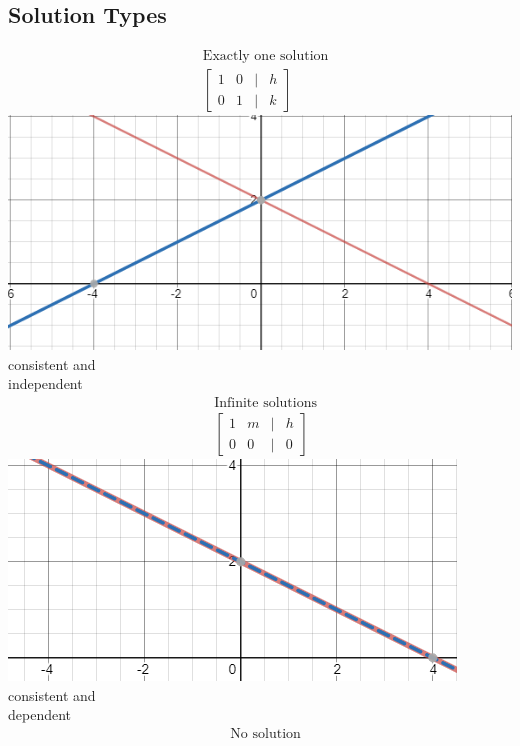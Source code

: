 \documentclass[14pt]{extarticle}
\begin{document}
\subsection*{Solution Types}
\begin{multicols}{3}
	\begin{align*}
		&\text{Exactly one solution} \\
		&\begin{bmatrix}
			1 & 0 & | & h\\
			0 & 1 & | & k
		\end{bmatrix} 
	\end{align*}
\includegraphics[width=1.0\linewidth]{4-1_a-15b}
consistent and \\independent
\vfill\null
\columnbreak
	\begin{align*}
		&\text{Infinite solutions} \\
		&\begin{bmatrix}
			1 & m & | & h\\
			0 & 0 & | & 0
		\end{bmatrix} 
	\end{align*}
\includegraphics[width=1.0\linewidth]{4-1_a-15c}
consistent and \\dependent
\vfill\null
\columnbreak
	\begin{align*}
		&\text{No solution} \\

\end{align*}
\end{multicols}
\end{document}
